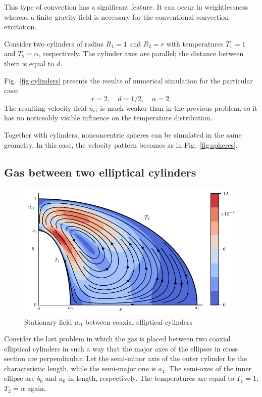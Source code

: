 \documentclass[smallextended, referee]{svjour3} %
\begin{document}
This type of convection has a significant feature. It can occur in weightlessness
whereas a finite gravity field is necessary for the conventional convection excitation.

Consider two cylinders of radius \(R_1 = 1\) and \(R_2 = r\)
with temperatures \(T_1 = 1\) and \(T_2 = \alpha\), respectively.
The cylinder axes are parallel; the distance between them is equal to \(d\).

Fig.~\ref{fig:cylinders} presents the results of numerical simulation for the particular case:
\[ r = 2, \quad d = 1/2, \quad \alpha = 2. \]
The resulting velocity field \(u_{i1}\) is much weaker than in the previous problem,
so it has no noticeably visible influence on the temperature distribution.

Together with cylinders, nonconcentric spheres can be simulated in the same geometry.
In this case, the velocity pattern becomes as in Fig.~\ref{fig:spheres}.

\subsection{Gas between two elliptical cylinders}

\begin{figure}
	\centering
	\includegraphics{Fig9}
	\caption{Stationary field \(u_{i1}\) between coaxial elliptical cylinders}
	\label{fig:elliptic}
\end{figure}

Consider the last problem in which the gas is placed between two coaxial elliptical cylinders
in such a way that the major axes of the ellipses in cross section are perpendicular.
Let the semi-minor axis of the outer cylinder be the characteristic length, while the semi-major one is \(a_1\).
The semi-axes of the inner ellipse are \(b_0\) and \(a_0\) in length, respectively.
The temperatures are equal to \(T_1 = 1\), \(T_2 = \alpha\) again.
\end{document}
